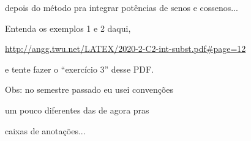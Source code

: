 \documentclass[oneside,12pt]{article}
\begin{document}
depois do método pra integrar potências de senos e cossenos...


\msk

Entenda os exemplos 1 e 2 daqui,

{\footnotesize

\url{http://angg.twu.net/LATEX/2020-2-C2-int-subst.pdf#page=12}

}

e tente fazer o ``exercício 3'' desse PDF.

Obs: no semestre passado eu usei convenções

um pouco diferentes das de agora pras

caixas de anotações...







\end{document}
